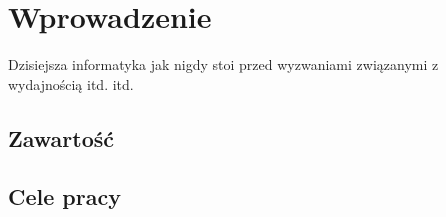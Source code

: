 \chapter{Wprowadzenie}
\label{cha:wprowadzenie}

Dzisiejsza informatyka jak nigdy stoi przed wyzwaniami związanymi z wydajnością itd. itd.

\section{Zawartość}
\label{sec:zawartosc}

\section{Cele pracy}
\label{sec:celePracy}
